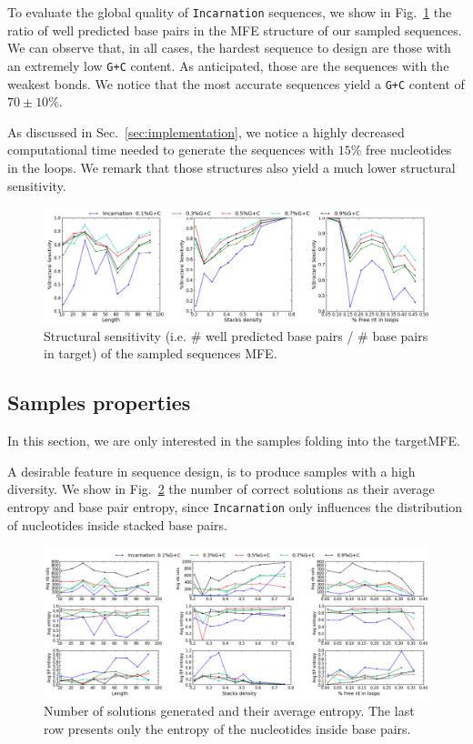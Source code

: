 To evaluate the global quality of \texttt{Incarnation} sequences, we show
in Fig.~\ref{fig:ss_sens} the ratio of well predicted base pairs in the
MFE structure of our sampled sequences. We can observe that, in all cases,
the hardest sequence to design are those with an extremely low \texttt{G+C}
content. As anticipated, those are the sequences with the weakest bonds.
We notice that the most accurate sequences yield a \texttt{G+C} content
of $70\pm 10\%$. 

As discussed in Sec.~\ref{sec:implementation}, we notice a highly decreased
computational time needed to generate the sequences with $15\%$ free 
nucleotides in the loops. We remark that those structures also yield 
a much lower structural sensitivity.

\begin{figure}[ht!]
 	\centering
	\includegraphics[scale=0.45]{Figures/rnastrand_clustered_rnainverse_100samples_struct_sens.png}
	\caption{Structural sensitivity (i.e. $\#$ well predicted base pairs / $\#$ base pairs in target) of the sampled sequences MFE. }
	\label{fig:ss_sens}	
\end{figure}


\subsection{Samples properties}

In this section, we are only interested  in the samples folding into the 
targetMFE. 

A desirable feature in sequence design, is to produce samples with a high
diversity. We show in Fig.~\ref{fig:nb_sols_entropy} the number of correct
solutions as their average entropy and base pair entropy, since \texttt{Incarnation}  only influences the distribution of nucleotides inside stacked base pairs.

\begin{figure}[ht!]
	\centering
	\includegraphics[scale=0.45]{Figures/nb_sols_entropy.png}
	\caption{Number of solutions generated and their average entropy. 
	The last row presents only the entropy of the nucleotides inside base 
	pairs.}
	\label{fig:nb_sols_entropy}
\end{figure}


